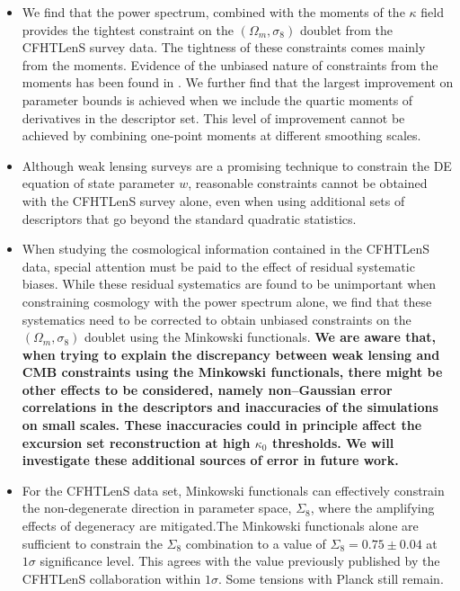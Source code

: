 \documentclass[reprint,aps,prd,superscriptaddress,showkeys,showpacs]{revtex4-1}
\begin{document}
\begin{itemize}

\item We find that the power spectrum, combined with the moments of
  the $\kappa$ field provides the tightest constraint on the
  $(\Omega_m,\sigma_8)$ doublet from the CFHTLenS survey data. The
  tightness of these constraints comes mainly from the
  moments. Evidence of the unbiased nature of constraints from the
  moments has been found in \citep{PetriSpurious}. We further find
  that the largest improvement on parameter bounds is achieved when we
  include the quartic moments of derivatives in the descriptor set. This
  level of improvement cannot be achieved by combining one-point
  moments at different smoothing scales.

\item Although weak lensing surveys are a promising technique to
  constrain the DE equation of state parameter $w$, reasonable
  constraints cannot be obtained with the CFHTLenS survey alone, even
  when using additional sets of descriptors that go beyond the
  standard quadratic statistics.

\item When studying the cosmological information contained in the
  CFHTLenS data, special attention must be paid to the effect of
  residual systematic biases. While these residual systematics are
  found to be unimportant when constraining cosmology with the power
  spectrum alone, we find that these systematics need to be corrected
  to obtain unbiased constraints on the $(\Omega_m,\sigma_8)$ doublet
  using the Minkowski functionals. \textbf{We are aware that, when trying to explain the discrepancy between weak lensing and CMB constraints using the Minkowski functionals, there might be other effects to be considered, namely non--Gaussian error correlations in the descriptors and inaccuracies of the simulations on small scales. These inaccuracies could in principle affect the excursion set reconstruction at high $\kappa_0$ thresholds. We will investigate these additional sources of error in future work.}

\item For the CFHTLenS data set, Minkowski functionals can effectively
  constrain the non-degenerate direction in parameter space,
  $\Sigma_8$, where the amplifying effects of degeneracy are
  mitigated.The Minkowski functionals alone are sufficient to
  constrain the $\Sigma_8$ combination to a value of
  $\Sigma_8=0.75\pm0.04$ at $1\sigma$ significance level. This agrees
  with the value previously published by the CFHTLenS collaboration
  within $1\sigma$. Some tensions with Planck \citep{PlanckXVI2013}
  still remain.

\end{itemize}
\end{document}
